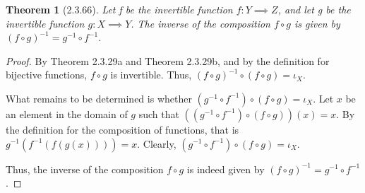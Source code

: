 \documentclass[a4paper, 12pt]{article}
\theoremstyle{plain}
\newtheorem*{theorem*}{Theorem}
\begin{document}
	
	\begin{theorem*}[2.3.66]
		Let f be the invertible function $f: Y \implies Z$, and let \newline g be the invertible 
		function $g: X \implies Y$. The inverse of the composition $f \circ g$ is given by 
		$(f \circ g)^{-1} = g^{-1} \circ f^{-1}$.
	\end{theorem*}
	
	\begin{proof}
		By Theorem 2.3.29a and Theorem 2.3.29b, and by the definition for bijective functions, 
		$f \circ g$ is invertible. Thus, $(f \circ g)^{-1} \circ (f \circ g) = \iota_X$. 
		
		What remains to be determined is whether $(g^{-1} \circ f^{-1}) \circ (f \circ g) = \iota_X$. 
		Let $x$ be an element in the domain of $g$ such that 
		$((g^{-1} \circ f^{-1}) \circ (f \circ g))(x) = x$. By the definition for the composition of 
		functions, that is $g^{-1}(f^{-1}(f(g(x)))) = x$. Clearly, 
		$(g^{-1} \circ f^{-1}) \circ (f \circ g) = \iota_X$.
		
		Thus, the inverse of the composition $f \circ g$ is indeed given by \newline 
		$(f \circ g)^{-1} = g^{-1} \circ f^{-1}$.
	\end{proof}
\end{document}
